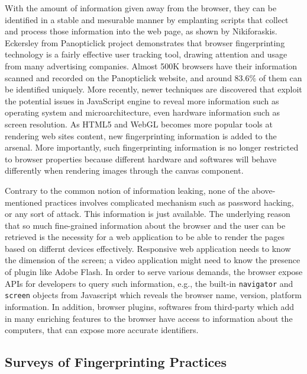 \documentclass{acm_proc_article-sp}
\begin{document}
With the amount of information given away from the browser, they can be identified in a stable and mesurable manner \cite{niki:cookie} by emplanting scripts that collect and process those information into the web page, as shown by Nikiforaskis. 
Eckersley from Panopticlick project \cite{panop} demonstrates that browser fingerprinting technology is a fairly effective user tracking tool, drawing attention and usage from many advertising companies. Almost 500K browsers have their information scanned and recorded on the Panopticlick website, and around $83.6\%$ of them can be identified uniquely.
More recently, newer techniques are discovered that exploit the potential issues in JavaScript engine to reveal more information such as operating system and microarchitecture, even hardware information such as screen resolution. \cite{mowery:fg} \cite{boda:user}
As HTML5 and WebGL becomes more popular tools at rendering web sites content, new fingerprinting information is added to the arsenal. More importantly, such fingerprinting information is no longer restricted to browser properties because different hardware and softwares will behave differently when rendering images through the canvas component.\cite{mowery:pixel}


Contrary to the common notion of information leaking, none of the above-mentioned practices involves complicated mechanism such as password hacking, or any sort of attack. This information is just available.
The underlying reason that so much fine-grained information about the browser and the user can be retrieved is the necessity for a web application to be able to render the pages based on differnt devices effectively. Responsive web application needs to know the dimension of the screen; a video application might need to know the presence of plugin like Adobe Flash. 
In order to serve various demands, the browser expose APIs for developers to query such information, e.g., the built-in \verb|navigator| and \verb|screen| objects from Javascript which reveals the browser name, version, platform information. 
In addition, browser plugins, softwares from third-party which add in many enriching features to the browser have access to information about the computers, that can expose more accurate identifiers.

\subsection{Surveys of Fingerprinting Practices}
\end{document}

